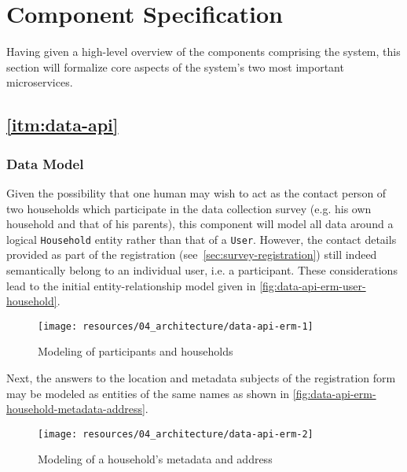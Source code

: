\section{Component Specification}
\label{sec:component-specification}

Having given a high-level overview of the components comprising the system, this section will formalize core aspects of the system's two most important microservices.

\subsection{\ref*{itm:data-api}}
\label{sec:component-specification-data-api}

\subsubsection{Data Model}
\label{sec:data-api-data-model}

Given the possibility that one human may wish to act as the contact person of two households which participate in the data collection survey (e.g. his own household and that of his parents), this component will model all data around a logical \texttt{Household} entity rather than that of a \texttt{User}. However, the contact details provided as part of the registration (see~\autoref{sec:survey-registration}) still indeed semantically belong to an individual user, i.e. a participant. These considerations lead to the initial entity-relationship model given in \autoref{fig:data-api-erm-user-household}.

\begin{figure}[hbt]
  \centering
  \texttt{[image: resources/04\_architecture/data-api-erm-1]}
  \caption{Modeling of participants and households}
  \label{fig:data-api-erm-user-household}
\end{figure}

\FloatBarrier

Next, the answers to the location and metadata subjects of the registration form may be modeled as entities of the same names as shown in \autoref{fig:data-api-erm-household-metadata-address}.

\begin{figure}[hbt]
  \centering
  \texttt{[image: resources/04\_architecture/data-api-erm-2]}
  \caption{Modeling of a household's metadata and address}
  \label{fig:data-api-erm-household-metadata-address}
\end{figure}

